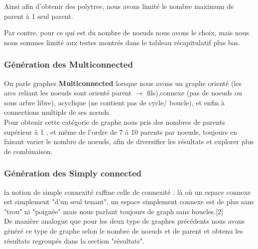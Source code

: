 \documentclass[12pt,a4paper,oneside]{book}
\begin{document}
    Ainsi afin d'obtenir des polytree, nous avons limité le nombre maximum de parent à 1 seul parent.
    
    Par contre, pour ce qui est du nombre de noeuds nous avons le choix, mais nous nous sommes limité aux testes montrés dans le tableau récapitulatif plus bas.
    
 
    
    \subsubsection{Génération des Multiconnected}
    On parle graphes \textbf{Multiconnected} lorsque nous avons un graphe orienté (les arcs reliant les noeuds sont orienté parent $\rightarrow$ fils),connexe (pas de noeuds ou sous arbre libre), acyclique (ne contient pas de cycle/ boucle), et enfin à connections multiple de ses nœuds.\\
    
    Pour obtenir cette catégorie de graphe nous pris des nombres de parents supérieur à 1 , et même de l'ordre de 7 à 10 parents par noeuds, toujours en faisant varier le nombre de noeuds, afin de diversifier les résultats et explorer plus de combinaison.
    
    \subsubsection{Génération des Simply connected}
    la notion de simple connexité raffine celle de connexité : là où un espace connexe est simplement "d'un seul tenant", un espace simplement connexe est de plus sans "trou" ni "poignée" mais nous parlant toujours de graph sans boucles.[2]\\
    
     De manière analogue que pour les deux type de graphes précédents nous avons généré ce type de graphe selon le nombre de noeuds et de parent et obtenu les résultats regroupés dans la section "résultats".
    
    \newpage
    
\end{document}
